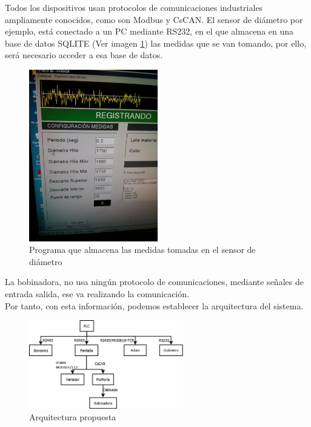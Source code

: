 Todos los dispositivos usan protocolos de comunicaciones industriales ampliamente conocidos, como son Modbus y CsCAN. El sensor de diámetro por ejemplo, está conectado a un PC mediante 
RS232, en el que almacena en una base de datos SQLITE (Ver imagen \ref{fig:hardware_sensor_diametro}) las medidas que se van tomando, por ello, será necesario acceder a esa base de datos.
 	\begin{figure}[H]
            \centering
            \includegraphics[width=0.5\textwidth]{images/Parametros_adquisicin.jpg}
            \caption{Programa que almacena las medidas tomadas en el sensor de diámetro}
            \label{fig:hardware_sensor_diametro}
    \end{figure}

La bobinadora, no usa ningún protocolo de comunicaciones, mediante señales de entrada salida, ese va realizando la comunicación.\\

Por tanto, con esta información, podemos establecer la arquitectura del sistema.\\

 	\begin{figure}[H]
            \centering
            \includegraphics[width=0.6\textwidth]{images/20141229.png}
            \caption{Arquitectura propuesta}
            \label{fig:hardware_arquitectura}
    \end{figure}


